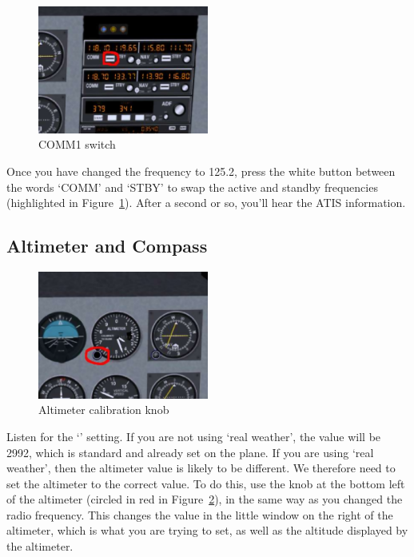 \begin{figure}[!htp]
\centering
\includegraphics[width=0.5\textwidth]{comm1_switch}
\caption{COMM1 switch\label{comm1switch}}
\end{figure}

Once you have changed the frequency to 125.2, press the white button between
the words `COMM' and `STBY' to swap the active and standby frequencies
(highlighted in Figure~\ref{comm1switch}). After a second or so, you'll hear the ATIS information.

\subsection{Altimeter and Compass}

\begin{figure}[!htp]
\centering
\includegraphics[width=0.5\textwidth]{altimeter}
\caption{Altimeter calibration knob\label{altimeter}}
\end{figure}

Listen for the `' setting. If you are not using `real weather',
the value will be 2992, which is standard and already set on the plane.
If you are using `real weather', then the altimeter value is likely to be different.
We therefore need to set the altimeter to the correct value.
To do this, use the knob at the bottom left of the altimeter
(circled in red in Figure~\ref{altimeter}), in the same way as
you changed the radio frequency. This changes the value in the
little window on the right of the altimeter, which is what you are
trying to set, as well as the altitude displayed by the altimeter.

